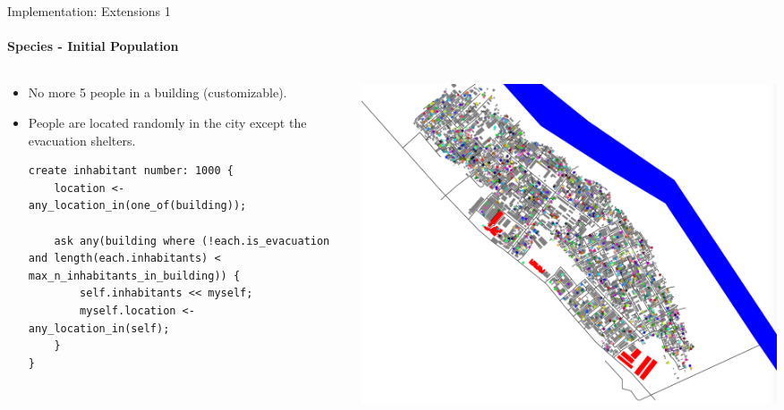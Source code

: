 \documentclass{beamer}
\begin{document}
\begin{frame}[fragile]{Implementation: Extensions 1}
\framesubtitle{Species - Initial Population}

\begin{columns}
\begin{column}{0.7\textwidth}
\begin{itemize}
    \item No more 5 people in a building (customizable).
    \item People are located randomly in the city except the evacuation shelters.

\begin{lstlisting}[style=GAML]
create inhabitant number: 1000 {
    location <- any_location_in(one_of(building));
    
    ask any(building where (!each.is_evacuation and length(each.inhabitants) < max_n_inhabitants_in_building)) {
        self.inhabitants << myself;
        myself.location <- any_location_in(self);
    }
}
\end{lstlisting}

\end{itemize}

\end{column}

\begin{column}{0.3\textwidth}
    \includegraphics[width=\textwidth]{img/People-in-building.png}
\end{column}
\end{columns}

\end{frame}
\end{document}
